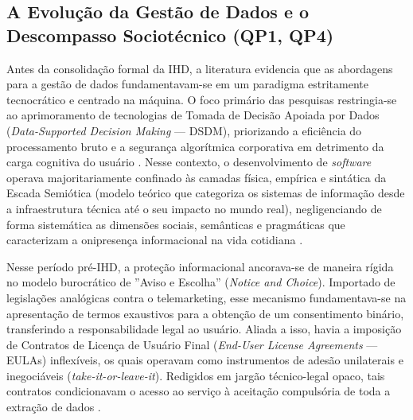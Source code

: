 \documentclass[12pt]{article}
\begin{document}
\subsection{A Evolução da Gestão de Dados e o Descompasso Sociotécnico (QP1, QP4)}

    Antes da consolidação formal da IHD, a literatura evidencia que as abordagens para a gestão de dados fundamentavam-se em um paradigma estritamente tecnocrático e centrado na máquina. O foco primário das pesquisas restringia-se ao aprimoramento de tecnologias de Tomada de Decisão Apoiada por Dados (\textit{Data-Supported Decision Making} — DSDM), priorizando a eficiência do processamento bruto e a segurança algorítmica corporativa em detrimento da carga cognitiva do usuário \cite{calvetti2024human, Locoro2020}. Nesse contexto, o desenvolvimento de \textit{software} operava majoritariamente confinado às camadas física, empírica e sintática da Escada Semiótica (modelo teórico que categoriza os sistemas de informação desde a infraestrutura técnica até o seu impacto no mundo real), negligenciando de forma sistemática as dimensões sociais, semânticas e pragmáticas que caracterizam a onipresença informacional na vida cotidiana \cite{Strey2019Human}.

    Nesse período pré-IHD, a proteção informacional ancorava-se de maneira rígida no modelo burocrático de ''Aviso e Escolha'' (\textit{Notice and Choice}). Importado de legislações analógicas contra o telemarketing, esse mecanismo fundamentava-se na apresentação de termos exaustivos para a obtenção de um consentimento binário, transferindo a responsabilidade legal ao usuário. Aliada a isso, havia a imposição de Contratos de Licença de Usuário Final (\textit{End-User License Agreements} — EULAs) inflexíveis, os quais operavam como instrumentos de adesão unilaterais e inegociáveis (\textit{take-it-or-leave-it}). Redigidos em jargão técnico-legal opaco, tais contratos condicionavam o acesso ao serviço à aceitação compulsória de toda a extração de dados \cite{Hutton2017, Jones2017}.
\end{document}
